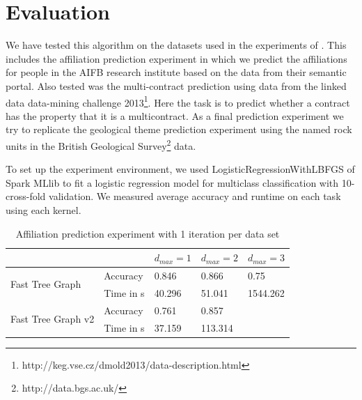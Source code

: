 \documentclass{easychair}
\begin{document}
\section{Evaluation}
\label{sect:Evaluation}

We have tested this algorithm on the datasets used in the experiments of \cite{FGK}. This includes the affiliation prediction experiment in which we predict the affiliations for people in the AIFB research institute based on the data from their semantic portal. Also tested was the multi-contract prediction using data from the linked data data-mining challenge 2013\footnote{http://keg.vse.cz/dmold2013/data-description.html}. Here the task is to predict whether a contract has the property that it is a multicontract. As a final prediction experiment we try to replicate the geological theme prediction experiment using the named rock units in the British Geological Survey\footnote{http://data.bgs.ac.uk/} data.

To set up the experiment environment, we used LogisticRegressionWithLBFGS of Spark MLlib to fit a logistic regression model for multiclass classification with 10-cross-fold validation. We measured average accuracy and runtime on each task using each kernel.

\begin{table}[h]
\centering
\caption{Affiliation prediction experiment with 1 iteration per data set}
\label{table:depth}
\begin{tabular}{l|l|l|l|l|}
\cline{2-5}
                                                          &          & $d_{max}=1$    & $d_{max}=2$     & $d_{max}=3$    \\ \hline
\multicolumn{1}{|l|}{\multirow{2}{*}{Fast Tree Graph}}    & Accuracy & 0.846  & 0.866   & 0.75   \\ \cline{2-5} 
\multicolumn{1}{|l|}{}                                    & Time in s     & 40.296 & 51.041  & 1544.262 \\ \hline
\multicolumn{1}{|l|}{\multirow{2}{*}{Fast Tree Graph v2}} & Accuracy & 0.761  & 0.857   &     \\ \cline{2-5} 
\multicolumn{1}{|l|}{}                                    & Time in s     & 37.159 & 113.314 &      \\ \hline
\end{tabular}
\end{table}
\end{document}
